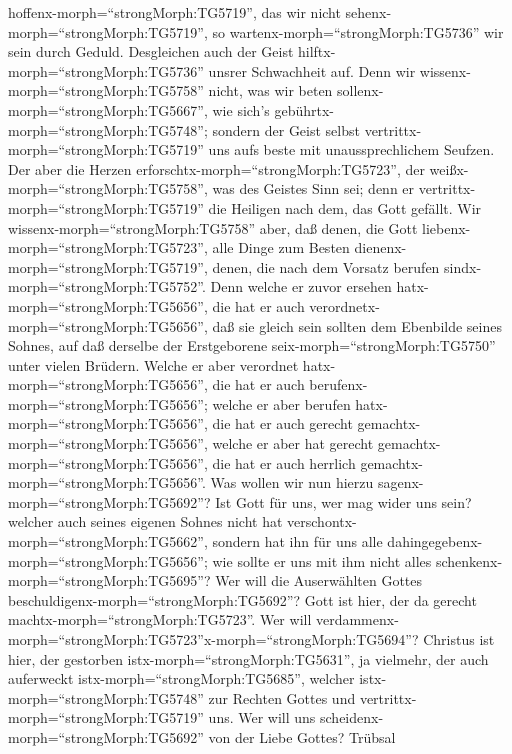 hoffenx-morph=``strongMorph:TG5719'', das wir nicht
sehenx-morph=``strongMorph:TG5719'', so
wartenx-morph=``strongMorph:TG5736'' wir sein durch Geduld.
 Desgleichen auch der Geist
hilftx-morph=``strongMorph:TG5736'' unsrer Schwachheit auf. Denn wir
wissenx-morph=``strongMorph:TG5758'' nicht, was wir beten
sollenx-morph=``strongMorph:TG5667'', wie sich's
gebührtx-morph=``strongMorph:TG5748''; sondern der Geist selbst
vertrittx-morph=``strongMorph:TG5719'' uns aufs beste mit
unaussprechlichem Seufzen.  Der aber die Herzen
erforschtx-morph=``strongMorph:TG5723'', der
weißx-morph=``strongMorph:TG5758'', was des Geistes Sinn sei; denn er
vertrittx-morph=``strongMorph:TG5719'' die Heiligen nach dem, das Gott
gefällt.  Wir wissenx-morph=``strongMorph:TG5758'' aber,
daß denen, die Gott liebenx-morph=``strongMorph:TG5723'', alle Dinge zum
Besten dienenx-morph=``strongMorph:TG5719'', denen, die nach dem Vorsatz
berufen sindx-morph=``strongMorph:TG5752''.  Denn welche er
zuvor ersehen hatx-morph=``strongMorph:TG5656'', die hat er auch
verordnetx-morph=``strongMorph:TG5656'', daß sie gleich sein sollten dem
Ebenbilde seines Sohnes, auf daß derselbe der Erstgeborene
seix-morph=``strongMorph:TG5750'' unter vielen Brüdern. 
Welche er aber verordnet hatx-morph=``strongMorph:TG5656'', die hat er
auch berufenx-morph=``strongMorph:TG5656''; welche er aber berufen
hatx-morph=``strongMorph:TG5656'', die hat er auch gerecht
gemachtx-morph=``strongMorph:TG5656'', welche er aber hat gerecht
gemachtx-morph=``strongMorph:TG5656'', die hat er auch herrlich
gemachtx-morph=``strongMorph:TG5656''.  Was wollen wir nun
hierzu sagenx-morph=``strongMorph:TG5692''? Ist Gott für uns, wer mag
wider uns sein?  welcher auch seines eigenen Sohnes nicht
hat verschontx-morph=``strongMorph:TG5662'', sondern hat ihn für uns
alle dahingegebenx-morph=``strongMorph:TG5656''; wie sollte er uns mit
ihm nicht alles schenkenx-morph=``strongMorph:TG5695''? 
Wer will die Auserwählten Gottes
beschuldigenx-morph=``strongMorph:TG5692''? Gott ist hier, der da
gerecht machtx-morph=``strongMorph:TG5723''.  Wer will
verdammenx-morph=``strongMorph:TG5723''\textbar x-morph=``strongMorph:TG5694''?
Christus ist hier, der gestorben istx-morph=``strongMorph:TG5631'', ja
vielmehr, der auch auferweckt istx-morph=``strongMorph:TG5685'', welcher
istx-morph=``strongMorph:TG5748'' zur Rechten Gottes und
vertrittx-morph=``strongMorph:TG5719'' uns.  Wer will uns
scheidenx-morph=``strongMorph:TG5692'' von der Liebe Gottes? Trübsal
